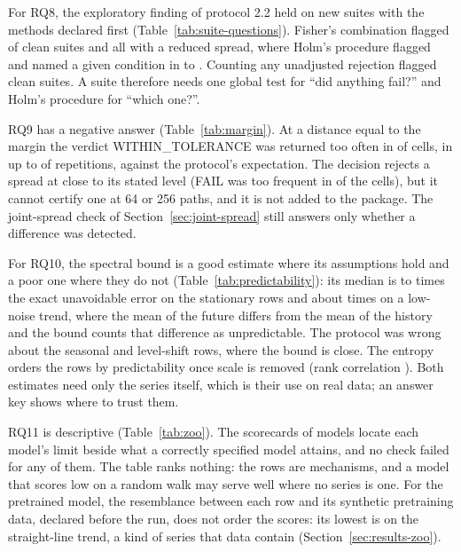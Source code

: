 \documentclass[11pt,a4paper]{article}
\begin{document}
For RQ8, the exploratory finding of protocol 2.2 held on new suites with
the methods declared first (Table~\ref{tab:suite-questions}). Fisher's
combination flagged \ThirdCleanFisherSuites{} of \ThirdSuites{} clean
suites and all \ThirdSpreadFisherSuites{} with a reduced spread, where
Holm's procedure flagged \ThirdSpreadHolmSuites{} and named a given
condition in \ThirdSpreadHolmLowest{} to \ThirdSpreadHolmHighest{}.
Counting any unadjusted rejection flagged \ThirdCleanRawSuites{} clean
suites. A suite therefore needs one global test for ``did anything
fail?'' and Holm's procedure for ``which one?''.

RQ9 has a negative answer (Table~\ref{tab:margin}). At a distance equal
to the margin the verdict WITHIN\_TOLERANCE was returned too often in
\ThirdWithinAbove{} of \ThirdMarginCells{} cells, in up to
\ThirdWithinHighest{} of \ThirdRepetitions{} repetitions, against the
protocol's expectation. The decision rejects a spread at close to its
stated level (FAIL was too frequent in \ThirdFailAbove{} of the
\ThirdMarginCells{} cells), but it cannot certify one at 64 or 256 paths,
and it is not added to the package. The joint-spread check of
Section~\ref{sec:joint-spread} still answers only whether a difference
was detected.

For RQ10, the spectral bound is a good estimate where its assumptions
hold and a poor one where they do not
(Table~\ref{tab:predictability}): its median is \ThirdSpectralLowest{} to
\ThirdSpectralHighest{} times the exact unavoidable error on the
stationary rows and about \ThirdSpectralTrend{} times on a low-noise
trend, where the mean of the future differs from the mean of the history
and the bound counts that difference as unpredictable. The protocol was
wrong about the seasonal and level-shift rows, where the bound is close.
The entropy orders the rows by predictability once scale is removed (rank
correlation \ThirdEntropyRho{}). Both estimates need only the series
itself, which is their use on real data; an answer key shows where to
trust them.

RQ11 is descriptive (Table~\ref{tab:zoo}). The scorecards of
\ThirdModels{} models locate each model's limit beside what a correctly
specified model attains, and no check failed for any of them. The table
ranks nothing: the rows are mechanisms, and a model that scores low on a
random walk may serve well where no series is one. For the pretrained
model, the resemblance between each row and its synthetic pretraining
data, declared before the run, does not order the scores: its lowest is on
the straight-line trend, a kind of series that data contain
(Section~\ref{sec:results-zoo}).
\end{document}
